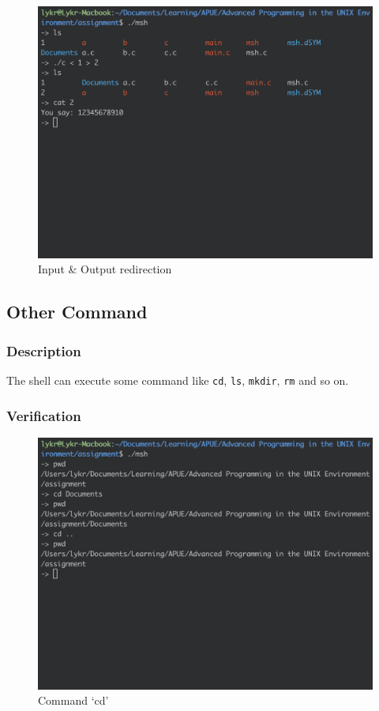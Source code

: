 \documentclass{article}
\begin{document}
\begin{figure}[h]
\centering
\includegraphics[scale=0.4]{fig/v4-3.png}
\caption{Input \& Output redirection}
\end{figure}

\newpage
\subsection{Other Command}

\subsubsection{Description}

The shell can execute some command like \verb|cd|, \verb|ls|, \verb|mkdir|, \verb|rm| and so on.

\subsubsection{Verification}

\begin{figure}[h]
\centering
\includegraphics[scale=0.4]{fig/v5-1.png}
\caption{Command `cd'}
\end{figure}
\end{document}
